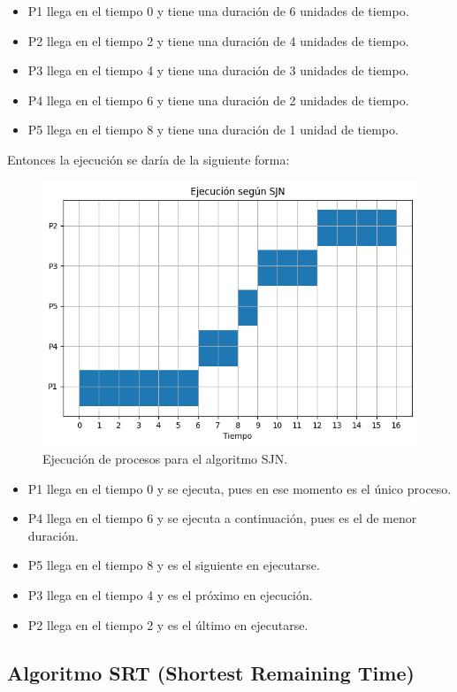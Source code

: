 \begin{itemize} 
	\item P1 llega en el tiempo 0 y tiene una duración de 6 unidades de tiempo. 
	\item P2 llega en el tiempo 2 y tiene una duración de 4 unidades de tiempo. 
	\item P3 llega en el tiempo 4 y tiene una duración de 3 unidades de tiempo. 
	\item P4 llega en el tiempo 6 y tiene una duración de 2 unidades de tiempo. 
	\item P5 llega en el tiempo 8 y tiene una duración de 1 unidad de tiempo. 
\end{itemize}
Entonces la ejecución se daría de la siguiente forma:
\begin{figure}[H] \centering \includegraphics[width=0.8\linewidth]{Imagenes/sjn_ejecucion.png} 
	\caption{Ejecución de procesos para el algoritmo SJN.} 
\end{figure}
\begin{itemize} 
    \item P1 llega en el tiempo 0 y se ejecuta, pues en ese momento es el único proceso. 
    \item P4 llega en el tiempo 6 y se ejecuta a continuación, pues es el de menor duración. 
    \item P5 llega en el tiempo 8 y es el siguiente en ejecutarse. 
    \item P3 llega en el tiempo 4 y es el próximo en ejecución. 
    \item P2 llega en el tiempo 2 y es el último en ejecutarse. 
\end{itemize}



\subsection{Algoritmo SRT (Shortest Remaining Time)}

